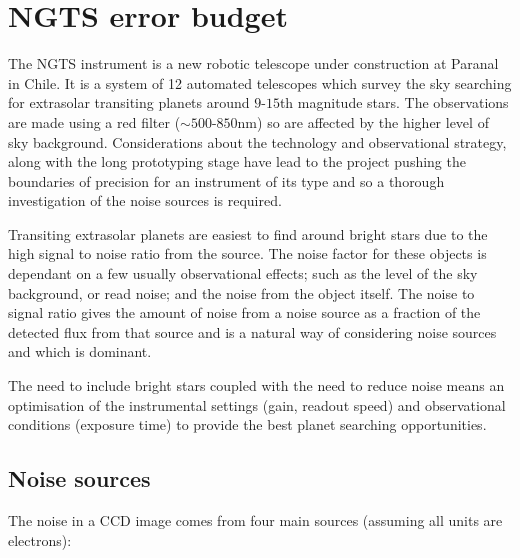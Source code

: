 \documentclass[11pt,a4paper]{report}
\begin{document}

\chapter{NGTS error budget}

The NGTS instrument is a new robotic telescope under construction at
Paranal in Chile. It is a system of 12 automated telescopes which survey
the sky searching for extrasolar transiting planets around $9$-$15$th
magnitude stars. The observations are made using a red filter ($\sim
500$-$850$nm) so are affected by the higher level of sky background.
Considerations about the technology and observational strategy, along
with the long prototyping stage have lead to the project pushing the
boundaries of precision for an instrument of its type and so a thorough
investigation of the noise sources is required.

Transiting extrasolar planets are easiest to find around bright 
stars due to the high signal to noise ratio from the source. The noise
factor for these objects is dependant on a few usually observational
effects; such as the level of the sky background, or read noise; and the
noise from the object itself. The noise to signal ratio gives the amount
of noise from a noise source as a fraction of the detected flux from
that source and is a natural way of considering noise sources and which
is dominant. 

The need to include bright stars coupled with the need to reduce noise
means an optimisation of the instrumental settings (gain, readout speed)
and observational conditions (exposure time) to provide the best planet
searching opportunities.

\section{Noise sources}

The noise in a CCD image comes from four main sources (assuming all
units are electrons):
\end{document}
